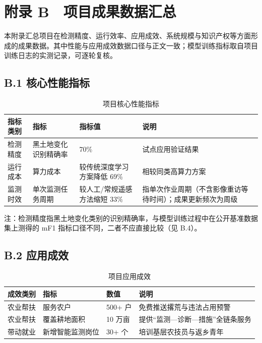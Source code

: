 \setcounter{table}{0}
\renewcommand{\thetable}{B-\arabic{table}}

\section{附录 B　项目成果数据汇总}

本附录汇总项目在检测精度、运行效率、应用成效、系统规模与知识产权等方面形成的成果数据。其中性能与应用成效数据口径与正文一致；模型训练指标取自项目训练日志的实测记录，可逐轮复核。

\subsection{B.1 核心性能指标}

\begin{table}[htbp]
    \centering
    \caption{项目核心性能指标}
    \label{tab:perf}
    \small
    \begin{tabular}{|p{2.6cm}|p{4.4cm}|p{3.6cm}|p{3.2cm}|}
        \hline
        \textbf{指标类别} & \textbf{指标} & \textbf{指标值} & \textbf{说明} \\
        \hline
        检测精度 & 黑土地变化识别精确率 & 70\% & 试点应用验证结果 \\
        \hline
        运行成本 & 算力成本 & 较传统深度学习方案降低 69\% & 相较同类高算力方案 \\
        \hline
        监测时效 & 单次监测任务周期 & 较人工/常规遥感方法缩短 33\% & 指单次作业周期（不含影像重访等待时间）；成果更新频次为周级 \\
        \hline
    \end{tabular}
    \par\vspace{2pt}
    {\footnotesize 注：检测精度指黑土地变化类别的识别精确率，与模型训练过程中在公开基准数据集上测得的 mF1 指标口径不同，二者不应直接比较（见 B.4）。}
\end{table}

\subsection{B.2 应用成效}

\begin{table}[htbp]
    \centering
    \caption{项目应用成效}
    \label{tab:effect}
    \small
    \begin{tabular}{|p{3.0cm}|p{4.4cm}|p{3.0cm}|p{3.4cm}|}
        \hline
        \textbf{成效类别} & \textbf{指标} & \textbf{数值} & \textbf{说明} \\
        \hline
        农业帮扶 & 服务农户 & 500+ 户 & 免费推送撂荒与违法占用预警 \\
        \hline
        农业帮扶 & 覆盖耕地面积 & 10 万亩 & 提供“监测—诊断—措施”全链条服务 \\
        \hline
        带动就业 & 新增智能监测岗位 & 30+ 个 & 培训基层农技员与返乡青年 \\
        \hline
    \end{tabular}
\end{table}

